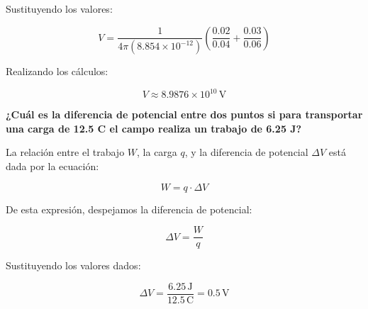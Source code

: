 \documentclass[answers]{exam} %
\begin{document}
\begin{questions}
\begin{enumerate}[label=\alph*)]
		      Sustituyendo los valores:

		      \[
			      V = \frac{1}{4 \pi (8.854 \times 10^{-12})} \left( \frac{0.02}{0.04} + \frac{0.03}{0.06} \right)
		      \]

		      Realizando los cálculos:

		      \[
			      V \approx 8.9876 \times 10^{10} \, \text{V}
		      \]
	\end{enumerate}

	\begin{center}
	\end{center}

	\vspace{0.5cm}

	\question \large\textbf{¿Cuál es la diferencia de potencial entre dos puntos si para transportar una carga de 12.5 C el campo realiza un trabajo de 6.25 J?}

	La relación entre el trabajo \(W\), la carga \(q\), y la diferencia de potencial \(\Delta V\) está dada por la ecuación:

	\[
		W = q \cdot \Delta V
	\]

	De esta expresión, despejamos la diferencia de potencial:

	\[
		\Delta V = \frac{W}{q}
	\]

	Sustituyendo los valores dados:

	\[
		\Delta V = \frac{6.25 \, \text{J}}{12.5 \, \text{C}} = 0.5 \, \text{V}
	\]


\end{questions}
\end{document}
